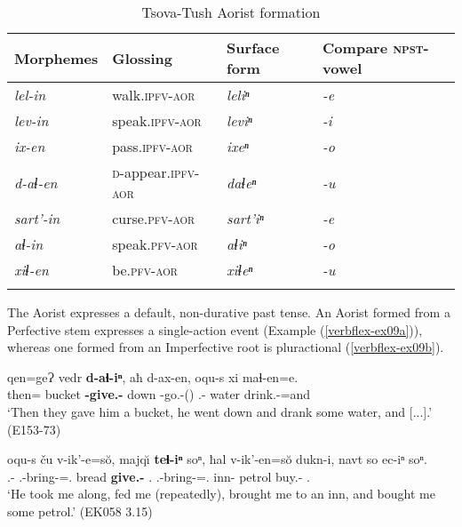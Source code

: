 \begin{table}
\begin{tabular}{llll}
	\lsptoprule
	Morphemes & {Glossing} & {Surface form} & Compare \textsc{npst}-vowel\\
	\midrule
	\textit{lel-in} & walk.\textsc{ipfv-aor} & \textit{leliⁿ} & \textit{-e} \\
	\textit{lev-in} & speak.\textsc{ipfv-aor} & \textit{leviⁿ} & \textit{-i} \\
	\textit{ix-en} & pass.\textsc{ipfv-aor} & \textit{ixeⁿ} & \textit{-o} \\
	\textit{d-aɬ-en} & \textsc{d}-appear.\textsc{ipfv-aor} & \textit{daɬeⁿ} & \textit{-u} \\
	\midrule
	\textit{sart'-in} & curse.\textsc{pfv-aor} & \textit{sart'iⁿ} & \textit{-e} \\
	\textit{aɬ-in} & speak.\textsc{pfv-aor} & \textit{aɬiⁿ} & \textit{-o} \\
	\textit{xiɬ-en} & be.\textsc{pfv-aor} & \textit{xiɬeⁿ} & \textit{-u} \\
	\lspbottomrule
\end{tabular}
\caption{Tsova-Tush Aorist formation}
\label{TAME-table5}
\end{table}

The Aorist expresses a default, non-durative past tense. An Aorist formed from a Perfective stem expresses a single-action event (Example (\ref{verbflex-ex09a})), whereas one formed from an Imperfective root is pluractional (\ref{verbflex-ex09b}).

\begin{exe}
	\ex\label{verbflex-ex09}
	\begin{xlist}
		
		
			\ex\label{verbflex-ex09a}
			\gll qen=geɁ vedr \textbf{d-aɬ-iⁿ}, aħ d-ax-en, oqu-s xi maɬ-en=e. \\
			then={\Emph} bucket \textbf{{\D}-give.{\Pfv}-{\Aor}} down {\D}-go.{\Pfv}-{\Aor}({\Seq}) {\Dist}.{\Obl}-{\Erg} water drink.{\Pfv}-{\Aor}=and \\
			\trans `Then they gave him a bucket, he went down and drank some water, and [...].'
			\hfill (E153-73)
		
		
		
		
		
			\ex\label{verbflex-ex09b}
			\gll oqu-s ču v-ik'-e=s\u{o}, majq\u{\i} \textbf{teɬ-iⁿ} soⁿ, ħal v-ik'-en=s\u{o} dukn-i, navt so ec-iⁿ soⁿ. \\
			{\Dist}.{\Obl}-{\Erg} {\Pv} {\M}.{\Sg}-bring-{\Aor}={\Fsg}.{\Nom} bread \textbf{give.{\Ipfv}-{\Aor}} {\Fsg}.{\Dat} {\Pv} {\M}.{\Sg}-bring-{\Aor}={\Fsg}.{\Nom} inn-{\Ill} petrol {\Pv} buy.{\Pfv}-{\Aor} {\Fsg}.{\Dat} \\
			\trans `He took me along, fed me (repeatedly), brought me to an inn, and bought me some petrol.'
			\hfill (EK058 3.15)
		
		
	\end{xlist}
\end{exe}



